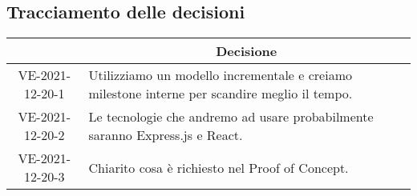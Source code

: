 \subsection{Tracciamento delle decisioni}

\begin{table}[H]
	\centering
	\renewcommand{\arraystretch}{1.8}
	\begin{tabular}{c | p{10cm}}
		\rowcolor[HTML]{125E28}
		\multicolumn{1}{c}{\color[HTML]{FFFFFF} \textbf{ID}} &
		\multicolumn{1}{c}{\color[HTML]{FFFFFF} \textbf{Decisione}} \\
		\hline
		VE-2021-12-20-1 & Utilizziamo un modello incrementale e creiamo milestone interne per scandire meglio il tempo. \\ \hline
		VE-2021-12-20-2 & Le tecnologie che andremo ad usare probabilmente saranno Express.js e React. \\ \hline
		VE-2021-12-20-3 & Chiarito cosa è richiesto nel Proof of Concept.
	\end{tabular}
\end{table}
